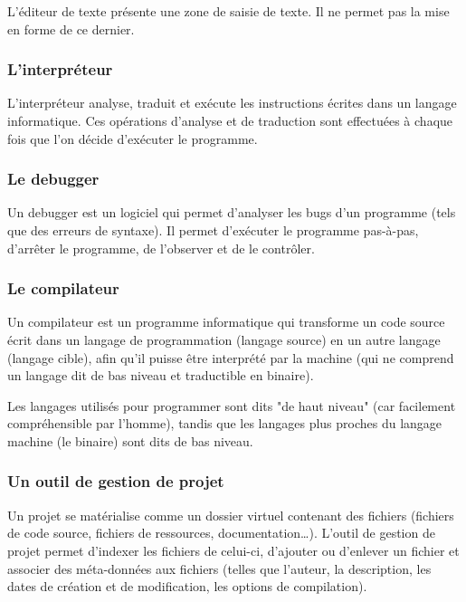 \documentclass[a4paper,12pt]{article}
\begin{document}
L'éditeur de texte présente une zone  de saisie de texte. Il ne permet
pas la mise en forme de ce dernier.

\subsubsection*{L'interpréteur}

L'interpréteur analyse,  traduit et  exécute les  instructions écrites
dans  un   langage  informatique.  Ces  opérations   d'analyse  et  de
traduction sont effectuées à chaque fois que l'on décide d'exécuter le
programme.

\subsubsection*{Le debugger}

Un  debugger est  un  logiciel  qui permet  d'analyser  les bugs  d'un
programme (tels que  des erreurs de syntaxe). Il  permet d'exécuter le
programme pas-à-pas,  d'arrêter le programme,  de l'observer et  de le
contrôler.

\subsubsection*{Le compilateur}

Un compilateur est un programme informatique qui transforme un code source écrit dans un langage de programmation (langage source) en un autre langage (langage cible), afin qu'il puisse être interprété par la machine (qui ne comprend un langage dit de bas niveau et traductible en binaire).

Les langages utilisés pour programmer sont dits "de haut niveau" (car facilement compréhensible par l'homme), tandis que les langages plus proches du langage machine (le binaire) sont dits de bas niveau. 

\subsubsection*{Un outil de gestion de projet}

Un  projet  se matérialise  comme  un  dossier virtuel  contenant  des
fichiers   (fichiers  de   code   source,   fichiers  de   ressources,
documentation\dots).  L'outil  de gestion  de projet  permet d'indexer
les  fichiers  de  celui-ci,  d'ajouter ou  d'enlever  un  fichier  et
associer  des  méta-données  aux  fichiers (telles  que  l'auteur,  la
description, les dates de création  et de modification, les options de
compilation).
\end{document}
